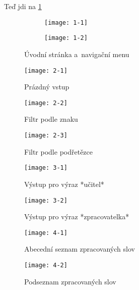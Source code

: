 Teď jdi na \ref{1}

\begin{figure}[ht]
  \begin{subfigure}[b]{0.45\textwidth}
    \texttt{[image: 1-1]}
  \end{subfigure}
  \hfill
  \begin{subfigure}[b]{0.45\textwidth}
    \texttt{[image: 1-2]}
  \end{subfigure}
  \caption{Úvodní stránka a~navigační menu}
  \label{1}
\end{figure}

\begin{figure}[ht]
  \centering
  \begin{minipage}[b]{0.26\textwidth}
    \texttt{[image: 2-1]}
    \caption{Prázdný vstup}
    \label{2-1}
  \end{minipage}
  \hfil
  \begin{minipage}[b]{0.26\textwidth}
    \texttt{[image: 2-2]}
    \caption{Filtr podle znaku}
    \label{2-2}
  \end{minipage}
    \hfil
  \begin{minipage}[b]{0.26\textwidth}
    \texttt{[image: 2-3]}
    \caption{Filtr podle podřetězce}
    \label{2-3}
  \end{minipage}
\end{figure}

\begin{figure}[ht]
  \centering
  \begin{minipage}[b]{0.4\textwidth}
    \texttt{[image: 3-1]}
    \caption{Výstup pro výraz *učitel*}
    \label{3-1}
  \end{minipage}
  \hfil
  \begin{minipage}[b]{0.4\textwidth}
    \texttt{[image: 3-2]}
    \caption{Výstup pro výraz *zpracovatelka*}
    \label{3-2}
  \end{minipage}
\end{figure}

\begin{figure}[ht]
  \centering
  \begin{minipage}[b]{0.4\textwidth}
    \texttt{[image: 4-1]}
    \caption{Abecední seznam zpracovaných slov}
    \label{4-1}
  \end{minipage}
  \hfil
  \begin{minipage}[b]{0.4\textwidth}
    \texttt{[image: 4-2]}
    \caption{Podseznam zpracovaných slov}
    \label{4-2}
  \end{minipage}
\end{figure}

